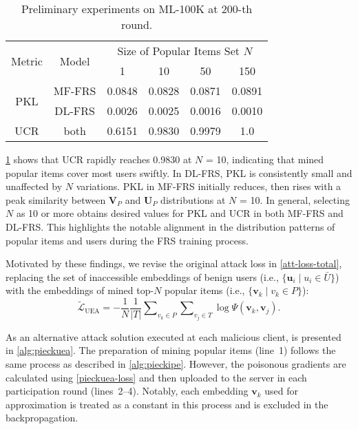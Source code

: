 \begin{table}[!htbp]
\centering
\setlength{\tabcolsep}{3.2mm}
\caption{Preliminary experiments on ML-100K at 200-th round.}
\label{tab:sim_kld}
\begin{tabular}{c|c|cccc}
\toprule
\multirow{2}{*}{Metric} & \multirow{2}{*}{Model} & \multicolumn{4}{c}{Size of Popular Items Set $N$} \\ \cmidrule{3-6} 
& & 1 & 10 & 50 & 150 \\ \midrule
\multirow{2}{*}{PKL} & MF-FRS & 0.0848 & 0.0828 & 0.0871 & 0.0891 \\
& DL-FRS & 0.0026 & 0.0025 & 0.0016 & 0.0010 \\
\rowcolor[HTML]{F2F2F2} UCR & both & 0.6151 & 0.9830 & 0.9979 & 1.0 
\\ \bottomrule
\end{tabular}
\end{table}

\cref{tab:sim_kld} shows that UCR rapidly reaches 0.9830 at $N$ = 10, indicating that mined popular items cover most users swiftly. 
In DL-FRS, PKL is consistently small and unaffected by $N$ variations.
PKL in MF-FRS initially reduces, then rises with a peak similarity between $\mathbf{V}_{P}$ and $\mathbf{U}_{P}$ distributions at $N$ = 10.
In general, selecting $N$ as 10 or more obtains desired values for PKL and UCR in both MF-FRS and DL-FRS. This highlights the notable alignment in the distribution patterns of popular items and users during the FRS training process.

Motivated by these findings, we revise the original attack loss in \cref{att-loss-total}, replacing the set of inaccessible embeddings of benign users (i.e., $\{ \mathbf{u}_i \mid u_i\in\bar{{U}} \}$) with the embeddings of mined top-$N$ popular items (i.e., $\{ \mathbf{v}_k \mid v_k\in{P} \}$): 
\begin{equation} \label{pieckuea-loss}
\tilde{\mathcal{L}}_\text{UEA} = -\frac{1}{N} \frac{1}{|{T}|} \sum\nolimits_{v_k\in{P}}\sum\nolimits_{v_j\in{T}} \log\Psi (\mathbf{v}_k, \mathbf{v}_j).
\end{equation}

As an alternative attack solution executed at each malicious client, \modelII{} is presented in \cref{alg:pieckuea}.
The preparation of mining popular items (line~1) follows the same process as described in \cref{alg:pieckipe}. However, the poisonous gradients are calculated using \cref{pieckuea-loss} and then uploaded to the server in each participation round (lines~2--4). Notably, each embedding $\mathbf{v}_k$ used for approximation is treated as a constant in this process and is excluded in the backpropagation.

